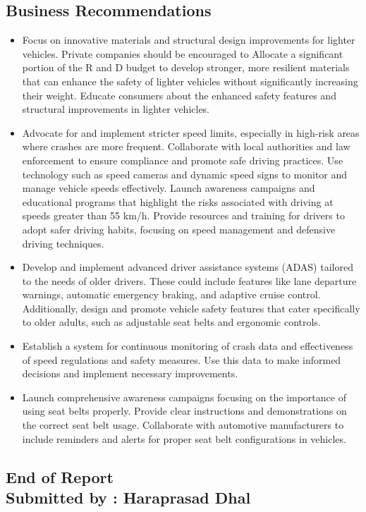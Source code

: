 \documentclass[12pt,a4paper]{article}
\begin{document}
	\subsection{Business Recommendations}
	\begin{itemize}
	\item Focus on innovative materials and structural design improvements for lighter vehicles. Private companies should be encouraged to Allocate a significant portion of the R and D budget to develop stronger, more resilient materials that can enhance the safety of lighter vehicles without significantly increasing their weight. Educate consumers about the enhanced safety features and structural improvements in lighter vehicles.
	
	\item Advocate for and implement stricter speed limits, especially in high-risk areas where crashes are more frequent. Collaborate with local authorities and law enforcement to ensure compliance and promote safe driving practices. Use technology such as speed cameras and dynamic speed signs to monitor and manage vehicle speeds effectively.  Launch awareness campaigns and educational programs that highlight the risks associated with driving at speeds greater than 55 km/h. Provide resources and training for drivers to adopt safer driving habits, focusing on speed management and defensive driving techniques.
	
	\item Develop and implement advanced driver assistance systems (ADAS) tailored to the needs of older drivers. These could include features like lane departure warnings, automatic emergency braking, and adaptive cruise control. Additionally, design and promote vehicle safety features that cater specifically to older adults, such as adjustable seat belts and ergonomic controls.
	
	\item Establish a system for continuous monitoring of crash data and effectiveness of speed regulations and safety measures. Use this data to make informed decisions and implement necessary improvements.
	
	\item Launch comprehensive awareness campaigns focusing on the importance of using seat belts properly. Provide clear instructions and demonstrations on the correct seat belt usage. Collaborate with automotive manufacturers to include reminders and alerts for proper seat belt configurations in vehicles.
	
	\end{itemize}
	\begin{centering}
		\vspace{20pt}
		\subsection*{End of Report\\Submitted by : Haraprasad Dhal}
	\end{centering}
\end{document}

